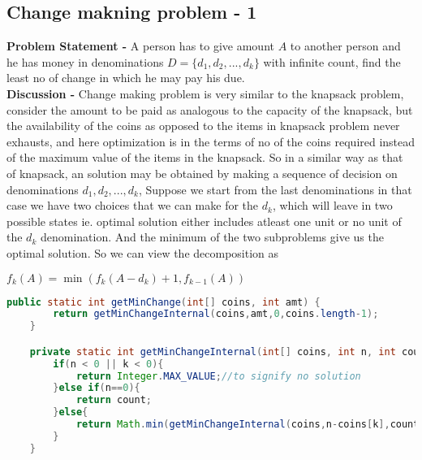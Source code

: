 \documentclass[10pt,a4paper,draft]{article}
\begin{document}
\subsection{Change makning problem - 1}
\textbf{Problem Statement -} A person has to give amount $A$ to another person and he has money in denominations $D = \{d_1,d_2,...,d_k\}$ with infinite count, find the least no of change in which he may pay his due.
\\[12pt]
\textbf{Discussion -} Change making problem is very similar to the knapsack problem, consider the amount to be paid as analogous to the capacity of the knapsack, but the availability of the coins as opposed to the items in knapsack problem never exhausts, and here optimization is in the terms of no of the coins required instead of the maximum value of the items in the knapsack. So in a similar way as that of knapsack, an solution may be obtained by making a sequence of decision on denominations $d_1,d_2,...,d_k$, Suppose we start from the last denominations in that case we have two choices that we can make for the $d_k$, which will leave in two possible states ie. optimal solution either includes atleast one unit or no unit of the $d_k$ denomination. And the minimum of the two subproblems give us the optimal solution. So we can view the decomposition as
\begin{center}
$f_k(A)=\min(f_k(A-d_k)+1,f_{k-1}(A))$
\end{center}
\begin{lstlisting}[language=Java]
	public static int getMinChange(int[] coins, int amt) {
		return getMinChangeInternal(coins,amt,0,coins.length-1);
	}

	private static int getMinChangeInternal(int[] coins, int n, int count,int k) {
		if(n < 0 || k < 0){
			return Integer.MAX_VALUE;//to signify no solution
		}else if(n==0){
			return count;
		}else{
			return Math.min(getMinChangeInternal(coins,n-coins[k],count+1,k), getMinChangeInternal(coins,n,count,k-1));
		}
	}
\end{lstlisting}
\end{document}
